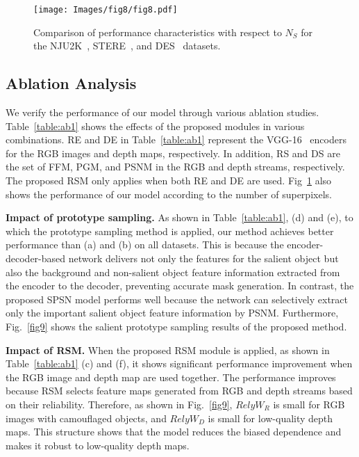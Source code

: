 \documentclass[runningheads]{llncs}
\begin{document}
	\begin{figure}[!t]
		\setlength{\belowcaptionskip}{-24pt}
		\begin{center}
			\texttt{[image: Images/fig8/fig8.pdf]}
			\caption{Comparison of performance characteristics with respect to $N_S$ for the NJU2K~\cite{ju2014depth}, STERE~\cite{niu2012leveraging}, and DES~\cite{cheng2014depth} datasets.}
			\label{fig:ab2}
		\end{center}
	\end{figure}
	
	\subsection{Ablation Analysis}
	We verify the performance of our model through various ablation studies. Table~\ref{table:ab1} shows the effects of the proposed modules in various combinations. RE and DE in Table~\ref{table:ab1} represent the VGG-16~\cite{simonyan2014very} encoders for the RGB images and depth maps, respectively. In addition, RS and DS are the set of FFM, PGM, and PSNM in the RGB and depth streams, respectively. The proposed RSM only applies when both RE and DE are used. Fig~\ref{fig:ab2} also shows the performance of our model according to the number of superpixels.
	
	\noindent
	\textbf{Impact of prototype sampling.} As shown in Table~\ref{table:ab1}, (d) and (e), to which the prototype sampling method is applied, our method achieves better performance than (a) and (b) on all datasets. This is because the encoder-decoder-based network delivers not only the features for the salient object but also the background and non-salient object feature information extracted from the encoder to the decoder, preventing accurate mask generation. In contrast, the proposed SPSN model performs well because the network can selectively extract only the important salient object feature information by PSNM. Furthermore, Fig.~\ref{fig9} shows the salient prototype sampling results of the proposed method.
	
	\noindent
	\textbf{Impact of RSM.} When the proposed RSM module is applied, as shown in Table~\ref{table:ab1} (c) and (f), it shows significant performance improvement when the RGB image and depth map are used together. The performance improves because RSM selects feature maps generated from RGB and depth streams based on their reliability. Therefore, as shown in Fig.~\ref{fig9}, $RelyW_{R}$ is small for RGB images with camouflaged objects, and $RelyW_{D}$ is small for low-quality depth maps. This structure shows that the model reduces the biased dependence and makes it robust to low-quality depth maps.
	
\end{document}
